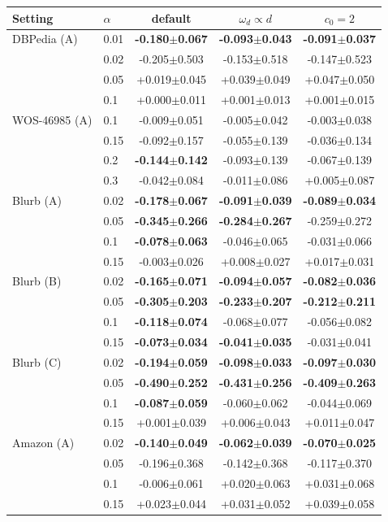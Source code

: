 \begin{tabular}{llccc}
\toprule
Setting & $\alpha$ & default & $\omega_d\propto d$ & $c_0=2$ \\
\midrule
DBPedia (A) & 0.01 & \textbf{-0.180$\pm$0.067} & \textbf{-0.093$\pm$0.043} & \textbf{-0.091$\pm$0.037} \\
 & 0.02 & -0.205$\pm$0.503 & -0.153$\pm$0.518 & -0.147$\pm$0.523 \\
 & 0.05 & +0.019$\pm$0.045 & +0.039$\pm$0.049 & +0.047$\pm$0.050 \\
 & 0.1 & +0.000$\pm$0.011 & +0.001$\pm$0.013 & +0.001$\pm$0.015 \\
\addlinespace
WOS-46985 (A) & 0.1 & -0.009$\pm$0.051 & -0.005$\pm$0.042 & -0.003$\pm$0.038 \\
 & 0.15 & -0.092$\pm$0.157 & -0.055$\pm$0.139 & -0.036$\pm$0.134 \\
 & 0.2 & \textbf{-0.144$\pm$0.142} & -0.093$\pm$0.139 & -0.067$\pm$0.139 \\
 & 0.3 & -0.042$\pm$0.084 & -0.011$\pm$0.086 & +0.005$\pm$0.087 \\
\addlinespace
Blurb (A) & 0.02 & \textbf{-0.178$\pm$0.067} & \textbf{-0.091$\pm$0.039} & \textbf{-0.089$\pm$0.034} \\
 & 0.05 & \textbf{-0.345$\pm$0.266} & \textbf{-0.284$\pm$0.267} & -0.259$\pm$0.272 \\
 & 0.1 & \textbf{-0.078$\pm$0.063} & -0.046$\pm$0.065 & -0.031$\pm$0.066 \\
 & 0.15 & -0.003$\pm$0.026 & +0.008$\pm$0.027 & +0.017$\pm$0.031 \\
\addlinespace
Blurb (B) & 0.02 & \textbf{-0.165$\pm$0.071} & \textbf{-0.094$\pm$0.057} & \textbf{-0.082$\pm$0.036} \\
 & 0.05 & \textbf{-0.305$\pm$0.203} & \textbf{-0.233$\pm$0.207} & \textbf{-0.212$\pm$0.211} \\
 & 0.1 & \textbf{-0.118$\pm$0.074} & -0.068$\pm$0.077 & -0.056$\pm$0.082 \\
 & 0.15 & \textbf{-0.073$\pm$0.034} & \textbf{-0.041$\pm$0.035} & -0.031$\pm$0.041 \\
\addlinespace
Blurb (C) & 0.02 & \textbf{-0.194$\pm$0.059} & \textbf{-0.098$\pm$0.033} & \textbf{-0.097$\pm$0.030} \\
 & 0.05 & \textbf{-0.490$\pm$0.252} & \textbf{-0.431$\pm$0.256} & \textbf{-0.409$\pm$0.263} \\
 & 0.1 & \textbf{-0.087$\pm$0.059} & -0.060$\pm$0.062 & -0.044$\pm$0.069 \\
 & 0.15 & +0.001$\pm$0.039 & +0.006$\pm$0.043 & +0.011$\pm$0.047 \\
\addlinespace
Amazon (A) & 0.02 & \textbf{-0.140$\pm$0.049} & \textbf{-0.062$\pm$0.039} & \textbf{-0.070$\pm$0.025} \\
 & 0.05 & -0.196$\pm$0.368 & -0.142$\pm$0.368 & -0.117$\pm$0.370 \\
 & 0.1 & -0.006$\pm$0.061 & +0.020$\pm$0.063 & +0.031$\pm$0.068 \\
 & 0.15 & +0.023$\pm$0.044 & +0.031$\pm$0.052 & +0.039$\pm$0.058 \\
\bottomrule
\end{tabular}
